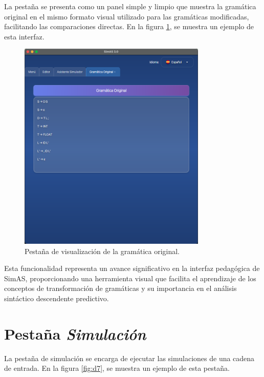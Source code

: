 La pestaña se presenta como un panel simple y limpio que muestra la gramática original en el mismo formato visual utilizado para las gramáticas modificadas, facilitando las comparaciones directas. En la figura \ref{fig:gramatica_original}, se muestra un ejemplo de esta interfaz.

\needspace{8cm}
\begin{figure}[H]
\centering
\includegraphics[width=0.8\textwidth]{figuras2/simulador/gramatica_original.png}
\caption{Pestaña de visualización de la gramática original.}
\label{fig:gramatica_original}
\end{figure}

Esta funcionalidad representa un avance significativo en la interfaz pedagógica de SimAS, proporcionando una herramienta visual que facilita el aprendizaje de los conceptos de transformación de gramáticas y su importancia en el análisis sintáctico descendente predictivo.

\section{Pestaña \textit{Simulación}}

La pestaña de simulación se encarga de ejecutar las simulaciones de una cadena de entrada. En la figura \ref{fig:d7}, se muestra un ejemplo de esta pestaña.


